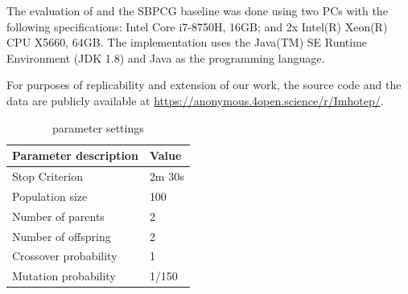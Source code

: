 The evaluation of \ApproachName{} and the SBPCG baseline was done using two PCs with the following specifications: Intel Core i7-8750H, 16GB; and  2x Intel(R) Xeon(R) CPU X5660, 64GB.
The implementation uses the Java(TM) SE Runtime Environment (JDK 1.8) and Java as the programming language. 

For purposes of replicability and extension of our work, the source code and the data are publicly available at \url{https://anonymous.4open.science/r/Imhotep/}.

\begin{table}[tb]
    \centering    
    \caption{\ApproachName{} parameter settings}
    \begin{tabular}{ll}
        \hline
        \bf{Parameter description}            & \bf{Value}  \\ \hline
        Stop Criterion                   & 2m 30s \\
        Population size                  & 100    \\
        Number of parents                & 2      \\
        Number of offspring              & 2      \\
        Crossover probability            & 1      \\
        Mutation probability             & 1/150 \\ \hline
    \end{tabular}

    \label{tab:evaluation_parameters}
    \end{table}




